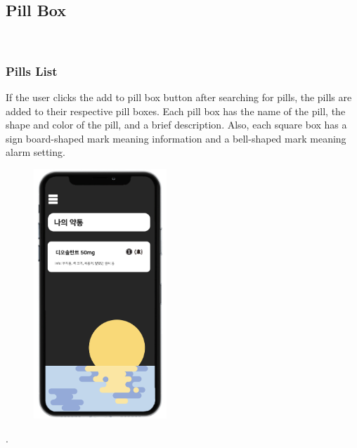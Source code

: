 \documentclass[conference]{IEEEtran}
\begin{document}
\subsection{Pill Box}\\

\subsubsection{Pills List}
If the user clicks the add to pill box button after searching for pills, the pills are added to their respective pill boxes. Each pill box has the name of the pill, the shape and color of the pill, and a brief description. Also, each square box has a sign board-shaped mark meaning information and a bell-shaped mark meaning alarm setting.\\

\begin{figure}[h!]
\centering
\includegraphics[width=5cm]{final_image_folder/pillbox.png}
\caption{}
\label{fig:map}
\end{figure}
.\\
\\
\\
\\
\\
\\
\\
\\
\\
\\
\\
\\
\\
\\
\\
\\
\end{document}
